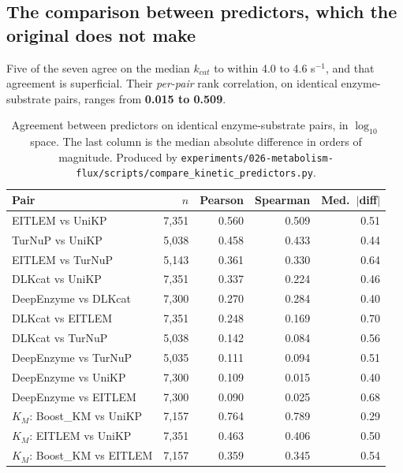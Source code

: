 \subsection{The comparison between predictors, which the original does not make}

Five of the seven agree on the median $k_{cat}$ to within
4.0 to 4.6 s$^{-1}$, and that agreement is superficial. Their \emph{per-pair} rank
correlation, on identical enzyme-substrate pairs, ranges from \textbf{0.015 to 0.509}.

\begin{table}[!htbp]
  \centering
  \footnotesize
  \caption[Predictor agreement]{Agreement between predictors on identical
  enzyme-substrate pairs, in $\log_{10}$ space. The last column is the median absolute
  difference in orders of magnitude. Produced by
  \texttt{experiments/026-metabolism-flux/scripts/compare\_kinetic\_predictors.py}.}
  \label{tab:agreement}
  \begin{tabular}{@{}lrrrr@{}}
    \hline
    Pair & $n$ & Pearson & Spearman & Med.\ $|$diff$|$ \\
    \hline
    EITLEM vs UniKP & 7{,}351 & 0.560 & 0.509 & 0.51 \\
    TurNuP vs UniKP & 5{,}038 & 0.458 & 0.433 & 0.44 \\
    EITLEM vs TurNuP & 5{,}143 & 0.361 & 0.330 & 0.64 \\
    DLKcat vs UniKP & 7{,}351 & 0.337 & 0.224 & 0.46 \\
    DeepEnzyme vs DLKcat & 7{,}300 & 0.270 & 0.284 & 0.40 \\
    DLKcat vs EITLEM & 7{,}351 & 0.248 & 0.169 & 0.70 \\
    DLKcat vs TurNuP & 5{,}038 & 0.142 & 0.084 & 0.56 \\
    DeepEnzyme vs TurNuP & 5{,}035 & 0.111 & 0.094 & 0.51 \\
    DeepEnzyme vs UniKP & 7{,}300 & 0.109 & 0.015 & 0.40 \\
    DeepEnzyme vs EITLEM & 7{,}300 & 0.090 & 0.025 & 0.68 \\
    \hline
    $K_M$: Boost\_KM vs UniKP & 7{,}157 & 0.764 & 0.789 & 0.29 \\
    $K_M$: EITLEM vs UniKP & 7{,}351 & 0.463 & 0.406 & 0.50 \\
    $K_M$: Boost\_KM vs EITLEM & 7{,}157 & 0.359 & 0.345 & 0.54 \\
    \hline
  \end{tabular}
\end{table}

